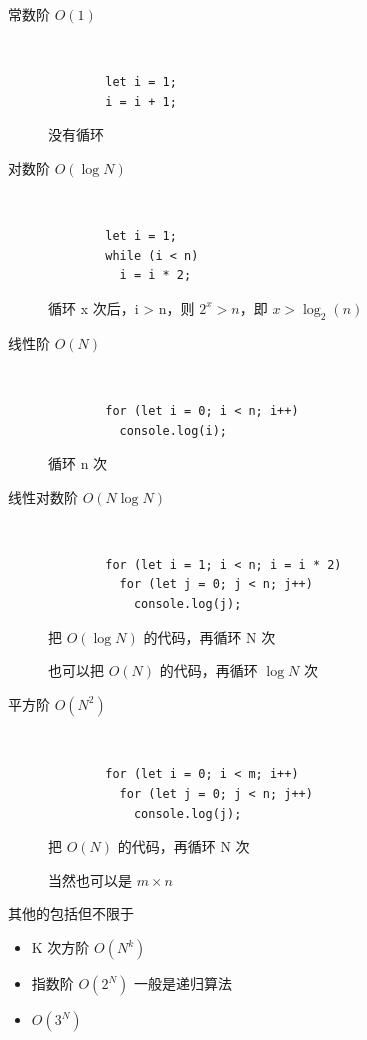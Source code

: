 \documentclass[11pt,journal,compsoc]{IEEEtran}
\begin{document}
\begin{description}
    \item[常数阶 $O(1)$] ~

    \begin{verbatim}
        let i = 1;
        i = i + 1;
    \end{verbatim}

    没有循环

    \item[对数阶 $O(\log N)$] ~

    \begin{verbatim}
        let i = 1;
        while (i < n)
          i = i * 2;
    \end{verbatim}

    循环 x 次后，i > n，则 $2^x > n$，即 $x > \log_2 (n)$

    \item[线性阶 $O(N)$] ~

    \begin{verbatim}
        for (let i = 0; i < n; i++)
          console.log(i);
    \end{verbatim}

    循环 n 次

    \item[线性对数阶 $O(N \log N)$] ~

    \begin{verbatim}
        for (let i = 1; i < n; i = i * 2)
          for (let j = 0; j < n; j++)
            console.log(j);
    \end{verbatim}

    把 $O(\log N)$ 的代码，再循环 N 次

    也可以把 $O(N)$ 的代码，再循环 $\log N$ 次

    \item[平方阶 $O(N^2)$] ~

    \begin{verbatim}
        for (let i = 0; i < m; i++)
          for (let j = 0; j < n; j++)
            console.log(j);
    \end{verbatim}

    把 $O(N)$ 的代码，再循环 N 次

    当然也可以是 $m \times n$
\end{description}

其他的包括但不限于

\begin{itemize}
    \item K 次方阶 $O(N^k)$

    \item 指数阶 $O(2^N)$ 一般是递归算法

    \item $O(3^N)$
\end{itemize}
\end{document}
